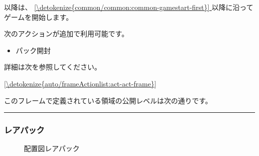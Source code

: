 \documentclass[letterpaper,10pt,dvipdfmx]{sphinxmanual}
\makeatletter
\renewcommand\sphinxlineitem[2]{%
  \sphinx@gobto@sphinxlineitem#2\@gobbletwo\sphinxlineitem\unless
  \iftrue
    \spx@lineitemlabel\expandafter{\the\spx@lineitemlabel\strut#1\\}%
  \else
    \item[\kern\labelwidth\kern-\itemindent\kern-\leftmargin
          {\parbox[t]{1.4\linewidth}{%
          \raggedright
          \the\spx@lineitemlabel%
          \strut#1}}%
          \kern-\labelsep]%
    \spx@lineitemlabel{}%
    \leavevmode
  \fi #2%
}
\makeatother
\begin{document}
\sphinxAtStartPar
以降は、 \hyperref[\detokenize{common/common:common-gamestart-first}]{\ref{\detokenize{common/common:common-gamestart-first}} } 以降に沿ってゲームを開始します。

\sphinxAtStartPar
{}

\sphinxAtStartPar
次のアクションが追加で利用可能です。
\begin{itemize}
\item {} 
\sphinxAtStartPar
パック開封

\end{itemize}

\sphinxAtStartPar
詳細は次を参照してください。

\sphinxAtStartPar
\hyperref[\detokenize{auto/frameActionlist:act-act-frame}]{\ref{\detokenize{auto/frameActionlist:act-act-frame}} }

\sphinxAtStartPar
{}

\sphinxAtStartPar
このフレームで定義されている領域の公開レベルは次の通りです。


\bigskip\hrule\bigskip



\subsubsection{レアパック}
\label{\detokenize{auto/framelist:frame-rarepack}}\label{\detokenize{auto/framelist:id4}}
\sphinxAtStartPar
{}

\begin{figure}[htbp]
\centering
\capstart

\noindent{}
\caption{配置図\sphinxhyphen{}レアパック}\label{\detokenize{auto/framelist:id8}}\label{\detokenize{auto/framelist:frame-rarepack-image}}\end{figure}
\end{document}
